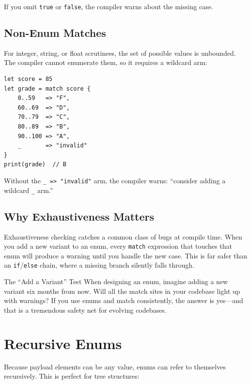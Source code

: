 If you omit \lstinline|true| or \lstinline|false|, the compiler warns about
the missing case.

\subsection{Non-Enum Matches}

For integer, string, or float scrutinees, the set of possible values is
unbounded. The compiler cannot enumerate them, so it requires a wildcard arm:

\begin{lstlisting}[language=Lattice, caption={Wildcard required for integer match}]
let score = 85
let grade = match score {
    0..59   => "F",
    60..69  => "D",
    70..79  => "C",
    80..89  => "B",
    90..100 => "A",
    _       => "invalid"
}
print(grade)  // B
\end{lstlisting}

Without the \lstinline|_ => "invalid"| arm, the compiler warns:
``consider adding a wildcard \lstinline|_| arm.''

\subsection{Why Exhaustiveness Matters}

Exhaustiveness checking catches a common class of bugs at compile time.
When you add a new variant to an enum, every \lstinline|match| expression
that touches that enum will produce a warning until you handle the new case.
This is far safer than an \lstinline|if|/\lstinline|else| chain, where a
missing branch silently falls through.

\begin{tipbox}{The ``Add a Variant'' Test}
When designing an enum, imagine adding a new variant six months from now.
Will all the match sites in your codebase light up with warnings? If you
use enums and match consistently, the answer is yes---and that is a
tremendous safety net for evolving codebases.
\end{tipbox}

\section{Recursive Enums}\label{sec:enum-recursive}

Because payload elements can be any value, enums can refer to themselves
recursively. This is perfect for tree structures:

